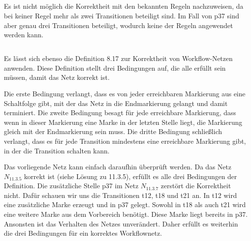 \documentclass[10pt,a4paper,oneside,ngerman,numbers=noenddot]{scrartcl}
\begin{document}
\subsection{}
Es ist nicht möglich die Korrektheit mit den bekannten Regeln nachzuweisen, da bei keiner Regel mehr als zwei Transitionen beteiligt sind. Im Fall von p37 sind aber genau drei Transitionen beteiligt, wodurch keine der Regeln angewendet werden kann.

\subsection{}
Es lässt sich ebenso die Definition 8.17 zur Korrektheit von Workflow-Netzen anwenden. Diese Definition stellt drei Bedingungen auf, die alle erfüllt sein müssen, damit das Netz korrekt ist.

Die erste Bedingung verlangt, dass es von jeder erreichbaren Markierung aus eine Schaltfolge gibt, mit der das Netz in die Endmarkierung gelangt und damit terminiert. Die zweite Bedingung besagt für jede erreichbare Markierung, dass wenn in dieser Markierung eine Marke in der letzten Stelle liegt, die Markierung gleich mit der Endmarkierung sein muss. Die dritte Bedingung schließlich verlangt, dass es für jede Transition mindestens eine erreichbare Markierung gibt, in der die Transition schalten kann.

Das vorliegende Netz kann einfach daraufhin überprüft werden. Da das Netz \(N_{11.3.5}\) korrekt ist (siehe Lösung zu 11.3.5), erfüllt es alle drei Bedingungen der Definition. Die zusätzliche Stelle p37 im Netz \(N_{11.3.7}\) zerstört die Korrektheit nicht. Dafür schauen wir uns die Transitionen t12, t18 und t21 an. In t12 wird eine zusätzliche Marke erzeugt und in p37 gelegt. Sowohl in t18 als auch t21 wird eine weitere Marke aus dem Vorbereich benötigt. Diese Marke liegt bereits in p37. Ansonsten ist das Verhalten des Netzes unverändert. Daher erfüllt es weiterhin die drei Bedingungen für ein korrektes Workflownetz.

\section{} %
\end{document}
